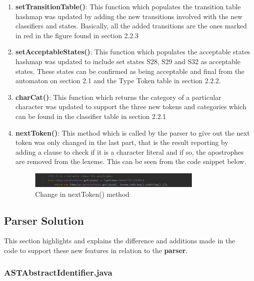 \documentclass{article}
\begin{document}
					\begin{enumerate}
					\item \textbf{setTransitionTable()}: This function which populates the transition table hashmap was updated by adding the new transitions involved with the new classifiers and states. Basically, all the added transitions are the ones marked in red in the figure found in section 2.2.3
					\item \textbf{setAcceptableStates()}: This function which populates the acceptable states hashmap was updated to include set states S28, S29 and S32 as acceptable states. These states can be confirmed as being acceptable and final from the automaton on section 2.1 and the Type Token table in section 2.2.2.
						\item \textbf{charCat()}: This function which returns the category of a particular character was updated to support the three new tokens and categories which can be found in the classifier table in section 2.2.1
						\item \textbf{nextToken()}: This method which is called by the parser to give out the next token was only changed in the last part, that is the result reporting by adding a clause to check if it is a character literal and if so, the apostrophes are removed from the lexeme. This can be seen from the code snippet below.
					\begin{center}
					\begin{figure}[H]
			 			\includegraphics[width=0.8\textwidth]{lexerchange.png}
			 			\centering
			  			\caption{Change in nextToken() method}
			  			\label{fig:lexerchange}
					\end{figure}
				\end{center}
						
					\end{enumerate}
					

		\subsection{Parser Solution}
		
		This section highlights and explains the difference and additions made in the code to support these new features in relation to the \textbf{parser}.
		
		\subsubsection{ASTAbstractIdentifier.java}
					
\end{document}
